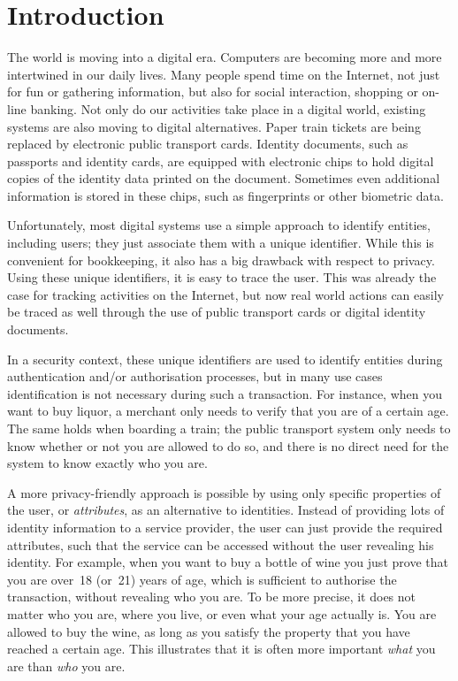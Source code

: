 \chapter{Introduction}

The world is moving into a digital era. Computers are becoming more and more
intertwined in our daily lives. Many people spend time on the Internet, not just
for fun or gathering information, but also for social interaction, shopping or
on-line banking. Not only do our activities take place in a digital world,
existing systems are also moving to digital alternatives. Paper train tickets
are being replaced by electronic public transport cards. Identity documents,
 such as passports and identity cards, are equipped
with electronic chips to hold digital copies of the identity data printed on the
document. Sometimes even additional information is stored in these chips, such
as fingerprints or other biometric data.

Unfortunately, most digital systems use a simple approach to identify entities, including users;
they just associate them with a unique identifier.
While this is convenient for bookkeeping, it also has a big drawback with
respect to privacy. Using these unique identifiers, it
is easy to trace the user. This was already the case for tracking 
activities on the Internet, but now real world actions can easily be
traced as well through the use of public transport cards or digital identity
documents.

In a security context, these unique identifiers are
used to identify entities during authentication and/or
authorisation processes, but in many use cases
identification is not necessary during such a transaction. For instance, when
you want to buy liquor, a merchant only needs to verify that you are of a
certain age. The same holds when boarding a train; the public transport system
only needs to know whether or not you are allowed to do so, and there is no
direct need for the system to know exactly who you are.

A more privacy-friendly approach is possible by using only specific properties
of the user, or \emph{attributes}, as an alternative to
identities. Instead of providing lots of identity
information to a service provider, the user can just provide the required
attributes, such that the service can be accessed without the user revealing his
identity. For example, when you want to buy a bottle of wine you just prove that
you are over~18 (or~21) years of age, which is sufficient to
authorise the transaction, without revealing who you are.
To be more precise, it does not matter who you are, where
you live, or even what your age actually is. You are allowed to buy the wine, as
long as you satisfy the property that you have reached a certain age. This
illustrates that it is often more important \emph{what} you are than \emph{who}
you are.

